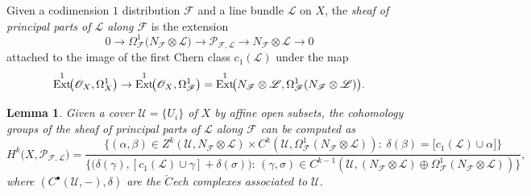 \documentclass[reqno]{amsart}
\theoremstyle{plain}
\newcommand{\OO}{\mathcal{O}}
\renewcommand{\L}{\mathcal{L}}
\newcommand{\U}{\mathcal{U}}
\newcommand{\F}{\mathscr{F}}
\newcommand{\PP}{\mathcal{P}}
\DeclareMathOperator{\Ext}{Ext}
\newtheorem{lemma}[theorem]{Lemma}
\theoremstyle{definition}
\theoremstyle{named}
\begin{document}
Given a codimension $1$ distribution $\F$ and a line bundle $\L$ on $X$, the \textit{sheaf of principal parts of $\L$ along $\F$} is the extension 
\[
0 \rightarrow  \Omega^1_{\F}\big(N_\F\otimes \L\big) \rightarrow {\PP_{\F,\L}} \rightarrow N_\F\otimes \L \rightarrow 0
\]
attached to the image of the first Chern class $c_1(\L)$ under the map
\[
\Ext^1\!\!\big(\OO_X,\Omega^1_X\big)\rightarrow \Ext^1\!\!\big(\OO_X, \Omega^1_\F\big) = \Ext^1\!\!\big(N_\F\otimes \L, \Omega^1_\F(N_\F\otimes \L)\big).\\
\]

\begin{lemma}\label{cohomology_principal_parts}
Given a cover $\U=\{U_i\}$ of $X$ by affine open subsets, the cohomology groups of the sheaf of principal parts of $\L$ along $\F$ can be computed as
{\smaller\[
H^{k}\big(X,\PP_{\F,\L}\big) = \frac{\big\{(\alpha,\beta)\in Z^k(\U,N_\F\otimes \L)\times C^{k}(\U,\Omega^1_\F(N_\F\otimes \L)):\; \delta(\beta) = \big[c_1(\L)\cup\alpha\big]  \big\}}{\big\{\big(\delta(\gamma),[c_1(\L)\cup\gamma]+\delta(\sigma)\big):\,(\gamma,\sigma)\in C^{k-1}(\U,(N_\F\otimes \L)\oplus\Omega^1_\F(N_\F\otimes \L))\big\}},
\]}
where $(C^\bullet(\U,-),\delta)$ are the $\check{C}$ech complexes associated to $\U$.
\end{lemma}
\end{document}
